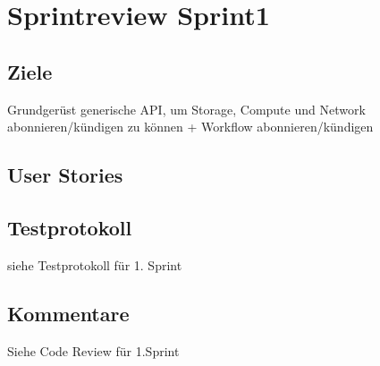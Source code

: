 \chapter{Sprintreview Sprint1}

\section{Ziele}
Grundgerüst generische API, um Storage, 
Compute und Network abonnieren/kündigen zu können + 
Workflow abonnieren/kündigen

\section{User Stories}



\newpage

\section{Testprotokoll}

siehe Testprotokoll für 1. Sprint

\section{Kommentare}

Siehe Code Review für 1.Sprint
